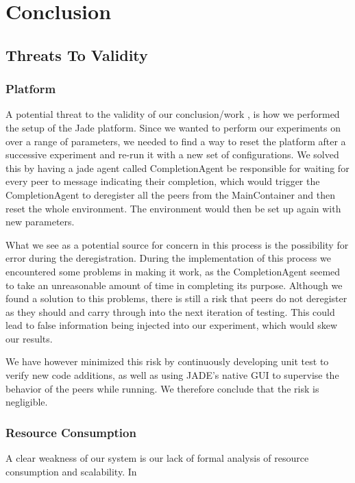 
\chapter{Conclusion}


\section{Threats To Validity}

\subsection{Platform}
A potential threat to the validity of our conclusion/work , is how we performed the setup of the Jade platform. Since we wanted to perform our experiments on over a range of parameters, we needed to find a way to reset the platform after a successive experiment and re-run it with a new set of configurations. We solved this by having a jade agent called CompletionAgent be responsible for waiting for every peer to message indicating their completion, which would trigger the CompletionAgent to deregister all the peers from the MainContainer and then reset the whole environment. The environment would then be set up again with new parameters. 

What we see as a potential source for concern in this process is the possibility for error during the deregistration. During the implementation of this process we encountered some problems in making it work, as the CompletionAgent seemed to take an unreasonable amount of time in completing its purpose. Although we found a solution to this problems, there is still a risk that peers do not deregister as they should and carry through into the next iteration of testing. This could lead to false information being injected into our experiment, which would skew our results.  

We have however minimized this risk by continuously developing unit test to verify new code additions, as well as using JADE's native GUI to supervise the behavior of the peers while running. We therefore conclude that the risk is negligible.

\subsection{Resource Consumption}
A clear weakness of our system is our lack of formal analysis of resource consumption and scalability. In 

